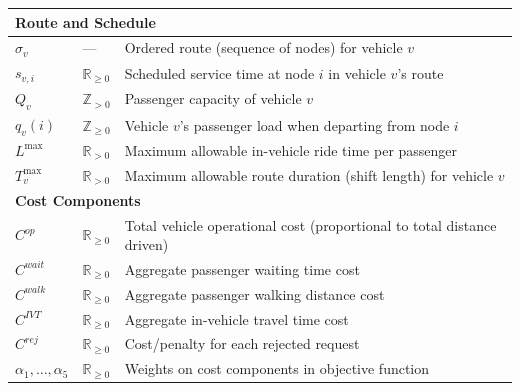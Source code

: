 \begin{longtable}{@{}lll@{}}
\multicolumn{3}{l}{\textbf{Route and Schedule}} \\
\midrule
$\sigma_v$ & --- & Ordered route (sequence of nodes) for vehicle $v$ \\
$s_{v,i}$ & $\mathbb{R}_{\geq 0}$ & Scheduled service time at node $i$ in vehicle $v$'s route \\
$Q_v$ & $\mathbb{Z}_{>0}$ & Passenger capacity of vehicle $v$ \\
$q_v(i)$ & $\mathbb{Z}_{\geq 0}$ & Vehicle $v$'s passenger load when departing from node $i$ \\
$L^{\max}$ & $\mathbb{R}_{>0}$ & Maximum allowable in-vehicle ride time per passenger \\
$T_v^{\max}$ & $\mathbb{R}_{>0}$ & Maximum allowable route duration (shift length) for vehicle $v$ \\
\midrule

\multicolumn{3}{l}{\textbf{Cost Components}} \\
\midrule
$C^{op}$ & $\mathbb{R}_{\geq 0}$ & Total vehicle operational cost (proportional to total distance driven) \\
$C^{wait}$ & $\mathbb{R}_{\geq 0}$ & Aggregate passenger waiting time cost \\
$C^{walk}$ & $\mathbb{R}_{\geq 0}$ & Aggregate passenger walking distance cost \\
$C^{IVT}$ & $\mathbb{R}_{\geq 0}$ & Aggregate in-vehicle travel time cost \\
$C^{rej}$ & $\mathbb{R}_{\geq 0}$ & Cost/penalty for each rejected request \\
$\alpha_1,\ldots,\alpha_5$ & $\mathbb{R}_{\geq 0}$ & Weights on cost components in objective function \\
\midrule


\end{longtable}
